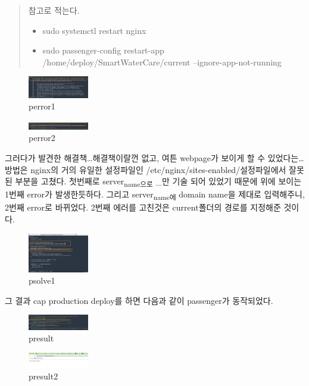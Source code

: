 \documentclass[11pt]{article}
\begin{document}
\begin{quote}
참고로 적는다. 
\begin{itemize}
\item sudo systemctl restart nginx
\item sudo passenger-config restart-app /home/deploy/SmartWaterCare/current --ignore-app-not-running
\end{itemize}
\end{quote}

\begin{figure}[htbp]
\centering
\includegraphics[width=100px]{./img/perror1.png}
\caption{\label{fig:orgd9e4caa}perror1}
\end{figure}

\begin{figure}[htbp]
\centering
\includegraphics[width=100px]{./img/perror2.png}
\caption{\label{fig:org63a32b1}perror2}
\end{figure}

\begin{note}
그러다가 발견한 해결책\ldots{}해결책이랄껀 없고, 여튼 webpage가 보이게 할 수 있었다는\ldots{}
방법은 nginx의 거의 유일한 설정파일인 /etc/nginx/sites-enabled/설정파일에서 잘못된 부분을 고쳤다. 첫번째로 server\textsubscript{name으로} \_만 기술 되어 있었기 때문에 위에 보이는 1번째 error가 발생한듯하다. 그리고 server\textsubscript{name에} domain name을 제대로 입력해주니, 2번째 error로 바뀌었다. 2번째 에러를 고친것은 current폴더의 경로를 지정해준 것이다.
\end{note}
\begin{figure}[htbp]
\centering
\includegraphics[width=100px]{./img/psolve1.png}
\caption{\label{fig:org61e4f50}psolve1}
\end{figure}

\begin{note}
그 결과 cap production deploy를 하면 다음과 같이 passenger가 동작되었다.
\end{note}
\begin{figure}[htbp]
\centering
\includegraphics[width=100px]{./img/presult1.png}
\caption{\label{fig:org1056109}presult}
\end{figure}

\begin{figure}[htbp]
\centering
\includegraphics[width=100px]{./img/presult2.png}
\caption{\label{fig:org87ed988}presult2}
\end{figure}
\end{document}
